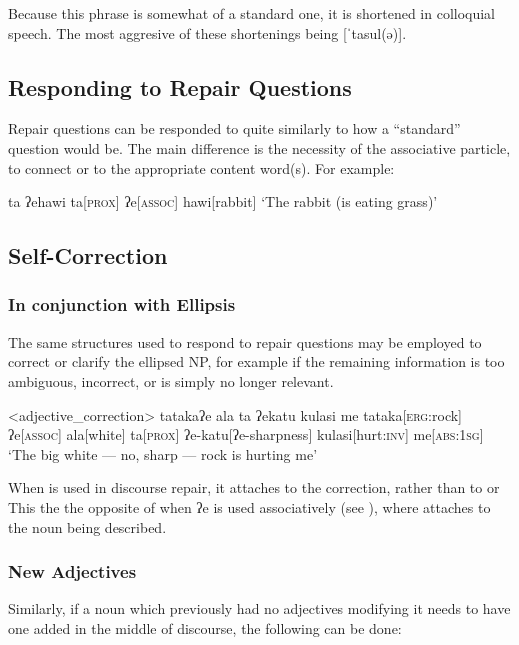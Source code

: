 Because this phrase is somewhat of a standard one, it is shortened in colloquial speech. The most aggresive of these shortenings being [ˈtasul(ə)].

\subsection{Responding to Repair Questions}\label{sec:repair_response}

Repair questions can be responded to quite similarly to how a ``standard'' question would be. The main difference is the necessity of the associative particle,  to connect  or  to the appropriate content word(s). For example:

\ex
\begingl
\glpreamble ta ʔehawi
\endpreamble
ta[\textsc{prox}]
ʔe[\textsc{assoc}]
hawi[rabbit]
\glft `The rabbit (is eating grass)'
\endgl
\xe
\subsection{Self-Correction}
\subsubsection{In conjunction with  Ellipsis}

The same structures used to respond to repair questions may be employed to correct or clarify the ellipsed NP, for example if the remaining information  is too ambiguous, incorrect, or is simply no longer relevant.

\ex<adjective_correction>
\begingl
\glpreamble tatakaʔe ala ta ʔekatu kulasi me
\endpreamble
tataka[\textsc{erg:}rock]
ʔe[\textsc{assoc}]
ala[white]
ta[\textsc{prox}]
ʔe-katu[ʔe-sharpness]
kulasi[hurt\textsc{:inv}]
me[\textsc{abs:1sg}]
\glft `The big white --- no, sharp --- rock is hurting me'
\endgl
\xe

When  is used in discourse repair, it attaches to the correction, rather than to  or  This the the opposite of when ʔe is used associatively (see ), where  attaches to the noun being described.

\subsubsection{New Adjectives}
Similarly, if a noun which previously had no adjectives modifying it needs to have one added in the middle of discourse, the following can be done:

